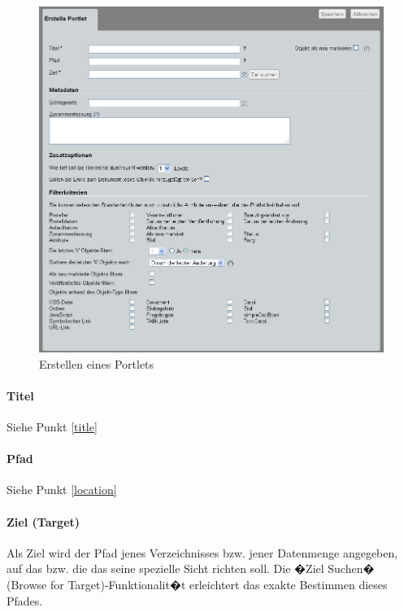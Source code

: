 \begin{figure}[!ht]
  \centering
  \includegraphics[width=\textwidth]{./images/erstelleportlet.png}
  \caption{Erstellen eines Portlets}
  \label{fig:erstelleportlet}
\end{figure}

\paragraph{Titel}
Siehe Punkt \ref{title}

\paragraph{Pfad}
Siehe Punkt \ref{location}

\paragraph{Ziel (Target)}
Als Ziel wird der Pfad jenes Verzeichnisses bzw. jener Datenmenge angegeben, auf
das bzw. die das  seine spezielle Sicht richten soll.
Die �Ziel Suchen� (Browse for Target)-Funktionalit�t erleichtert das exakte
Bestimmen dieses Pfades.

